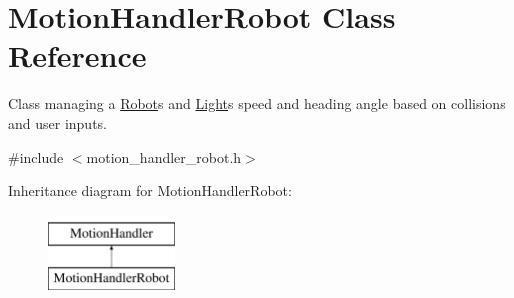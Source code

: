 \hypertarget{class_motion_handler_robot}{}\section{Motion\+Handler\+Robot Class Reference}
\label{class_motion_handler_robot}


Class managing a \mbox{\hyperlink{class_robot}{Robot}}\textquotesingle{}s and \mbox{\hyperlink{class_light}{Light}}\textquotesingle{}s speed and heading angle based on collisions and user inputs.  




{\ttfamily \#include $<$motion\+\_\+handler\+\_\+robot.\+h$>$}

Inheritance diagram for Motion\+Handler\+Robot\+:\begin{figure}[H]
\begin{center}
\leavevmode
\includegraphics[height=2.000000cm]{class_motion_handler_robot}
\end{center}
\end{figure}
